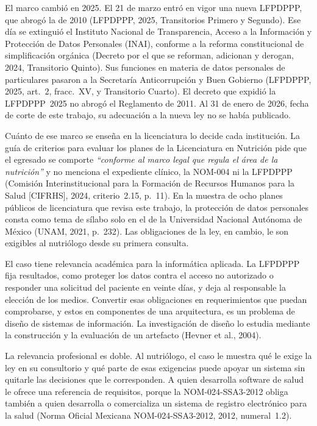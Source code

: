 \documentclass[12pt, a4paper]{article}
\begin{document}
El marco cambió en 2025. El 21 de marzo entró en vigor una nueva
LFPDPPP, que abrogó la de 2010 (LFPDPPP, 2025, Transitorios Primero y
Segundo). Ese día se extinguió el Instituto Nacional de Transparencia,
Acceso a la Información y Protección de Datos Personales (INAI),
conforme a la reforma constitucional de simplificación orgánica (Decreto
por el que se reforman, adicionan y derogan, 2024, Transitorio Quinto).
Sus funciones en materia de datos personales de particulares pasaron a
la Secretaría Anticorrupción y Buen Gobierno (LFPDPPP, 2025, art.~2,
fracc.~XV, y Transitorio Cuarto). El decreto que expidió la LFPDPPP~2025
no abrogó el Reglamento de 2011. Al 31 de enero de 2026, fecha de corte
de este trabajo, su adecuación a la nueva ley no se había publicado.
 
Cuánto de ese marco se enseña en la licenciatura lo decide cada
institución. La guía de criterios para evaluar los planes de la
Licenciatura en Nutrición pide que el egresado se comporte
\textit{``conforme al marco legal que regula el área de la nutrición''}
y no menciona el expediente clínico, la NOM-004 ni la LFPDPPP (Comisión
Interinstitucional para la Formación de Recursos Humanos para la Salud
[CIFRHS], 2024, criterio~2.15, p.~11). En la muestra de
ocho planes públicos de licenciatura que revisa este trabajo, la
protección de datos personales consta como tema de sílabo solo en el
de la Universidad Nacional Autónoma de México (UNAM, 2021, p.~232). Las
obligaciones de la ley, en cambio, le son exigibles al nutriólogo desde
su primera consulta.
 
El caso tiene relevancia académica para la informática aplicada. La
LFPDPPP fija resultados, como proteger los datos contra el acceso no
autorizado o responder una solicitud del paciente en veinte días, y
deja al responsable la elección de los medios. Convertir esas
obligaciones en requerimientos que puedan comprobarse, y estos en
componentes de una arquitectura, es un problema de diseño de sistemas
de información. La investigación de diseño lo estudia mediante la
construcción y la evaluación de un artefacto (Hevner et al., 2004).
 
La relevancia profesional es doble. Al nutriólogo, el caso le muestra
qué le exige la ley en su consultorio y qué parte de esas exigencias
puede apoyar un sistema sin quitarle las decisiones que le
corresponden. A quien desarrolla software de salud le ofrece una
referencia de requisitos, porque la NOM-024-SSA3-2012 obliga también a
quien desarrolla o comercializa un sistema de registro electrónico para
la salud (Norma Oficial Mexicana NOM-024-SSA3-2012, 2012,
numeral~1.2).
\end{document}
